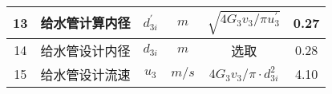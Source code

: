 \begin{table}[H]
{\begin{tabular}{|c|c|c|c|c|c|}
            13   & 给水管计算内径 & $ d_{3i}^{'} $     & $ m $      & $ \sqrt{4 G_{3} v_{3} / \pi u_{3}^{\prime}} $        & 0.27              \\ \hline
            14   & 给水管设计内径 & $ d_{3i} $         & $ m $      & 选取                                                 & 0.28              \\ \hline
            15   & 给水管设计流速 & $ u_3 $            & $ m/s $    & $ 4 G_{3} v_{3} / \pi \cdot d_{3 i}^{2} $            & 4.10              \\ \hline
        \end{tabular}
    }
\end{table}